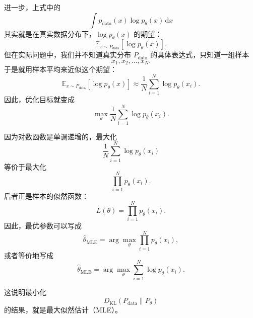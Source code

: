 进一步，上式中的
\[
\int p_{\mathrm{data}}(x)\log p_\theta(x)\,\mathrm{d}x
\]
其实就是在真实数据分布下，\(\log p_\theta(x)\) 的期望：
\[
\mathbb{E}_{x\sim P_{\mathrm{data}}}\left[\log p_\theta(x)\right].
\]
但在实际问题中，我们并不知道真实分布 \(P_{\mathrm{data}}\) 的具体表达式，只知道一组样本
\[
x_1,x_2,\dots,x_N.
\]
于是就用样本平均来近似这个期望：
\[
\mathbb{E}_{x\sim P_{\mathrm{data}}}[\log p_\theta(x)]
\approx
\frac{1}{N}\sum_{i=1}^N \log p_\theta(x_i).
\]
因此，优化目标就变成
\[
\max_\theta \frac{1}{N}\sum_{i=1}^N \log p_\theta(x_i).
\]


因为对数函数是单调递增的，最大化
\[
\frac{1}{N}\sum_{i=1}^N \log p_\theta(x_i)
\]
等价于最大化
\[
\prod_{i=1}^N p_\theta(x_i).
\]
后者正是样本的似然函数：
\[
L(\theta)=\prod_{i=1}^N p_\theta(x_i).
\]
因此，最优参数可以写成
\[
\hat{\theta}_{\mathrm{MLE}}
=
\arg\max_\theta \prod_{i=1}^N p_\theta(x_i),
\]
或者等价地写成
\[
\hat{\theta}_{\mathrm{MLE}}
=
\arg\max_\theta \sum_{i=1}^N \log p_\theta(x_i).
\]

这说明最小化
\[
D_{\mathrm{KL}}(P_{\mathrm{data}}\|P_\theta)
\]
的结果，就是最大似然估计（MLE）。
